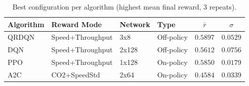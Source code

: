 \begin{table}[htbp]
\centering
\caption{Best configuration per algorithm (highest mean final reward, 3 repeats).}
\label{tab:best_per_algo}
\begin{tabular}{llllcc}
\toprule
Algorithm & Reward Mode & Network & Type & $\bar{r}$ & $\sigma$ \\
\midrule
QRDQN & Speed+Throughput & 3x8 & Off-policy & $0.5897$ & $0.0529$ \\
DQN & Speed+Throughput & 2x128 & Off-policy & $0.5612$ & $0.0756$ \\
PPO & Speed+Throughput & 1x128 & On-policy & $0.5850$ & $0.0179$ \\
A2C & CO2+SpeedStd & 2x64 & On-policy & $0.4584$ & $0.0339$ \\
\bottomrule
\end{tabular}
\end{table}